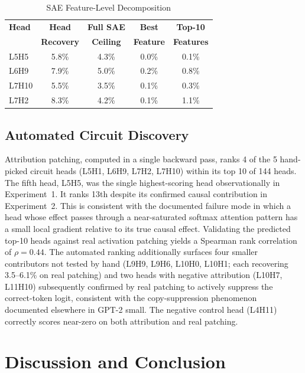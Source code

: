\documentclass[conference]{IEEEtran}
\begin{document}
\begin{table}[htbp]
\centering
\caption{SAE Feature-Level Decomposition}
\label{tab:sae}
\small
\begin{tabular}{lcccc}
\toprule
\textbf{Head} & \textbf{Head} & \textbf{Full SAE} & \textbf{Best} & \textbf{Top-10} \\
 & \textbf{Recovery} & \textbf{Ceiling} & \textbf{Feature} & \textbf{Features} \\
\midrule
L5H5  & 5.8\% & 4.3\% & 0.0\% & 0.1\% \\
L6H9  & 7.9\% & 5.0\% & 0.2\% & 0.8\% \\
L7H10 & 5.5\% & 3.5\% & 0.1\% & 0.3\% \\
L7H2  & 8.3\% & 4.2\% & 0.1\% & 1.1\% \\
\bottomrule
\end{tabular}
\end{table}

\subsection{Automated Circuit Discovery}

Attribution patching, computed in a single backward pass, ranks 4 of the 5 hand-picked circuit heads (L5H1, L6H9, L7H2, L7H10) within its top 10 of 144 heads. The fifth head, L5H5, was the single highest-scoring head observationally in Experiment~1. It ranks 13th despite its confirmed causal contribution in Experiment~2. This is consistent with the documented failure mode in which a head whose effect passes through a near-saturated softmax attention pattern has a small local gradient relative to its true causal effect. Validating the predicted top-10 heads against real activation patching yields a Spearman rank correlation of $\rho = 0.44$. The automated ranking additionally surfaces four smaller contributors not tested by hand (L9H9, L9H6, L10H0, L10H1; each recovering 3.5--6.1\% on real patching) and two heads with negative attribution (L10H7, L11H10) subsequently confirmed by real patching to actively suppress the correct-token logit, consistent with the copy-suppression phenomenon documented elsewhere in GPT-2 small. The negative control head (L4H11) correctly scores near-zero on both attribution and real patching.

\section{Discussion and Conclusion}
\end{document}
